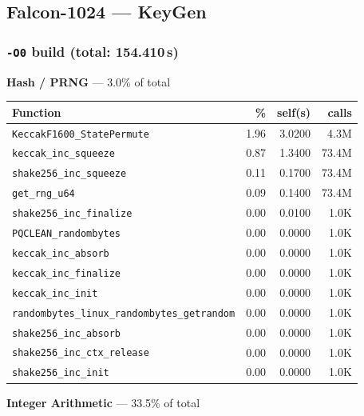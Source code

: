 \documentclass[11pt,a4paper]{article}
\begin{document}
\subsection{Falcon-1024 --- KeyGen}

\subsubsection*{\texttt{-O0} build (total: 154.410\,s)}

\noindent\colorbox{hashcolor}{\strut \textbf{Hash / PRNG} --- 3.0\% of total}
\vspace{2pt}

\begin{longtable}{p{7.5cm}rrr}
\toprule
Function & \% & self(s) & calls \\
\midrule
\endhead
  \texttt{KeccakF1600\_StatePermute} & 1.96 & 3.0200 & 4.3M \\
  \texttt{keccak\_inc\_squeeze} & 0.87 & 1.3400 & 73.4M \\
  \texttt{shake256\_inc\_squeeze} & 0.11 & 0.1700 & 73.4M \\
  \texttt{get\_rng\_u64} & 0.09 & 0.1400 & 73.4M \\
  \texttt{shake256\_inc\_finalize} & 0.00 & 0.0100 & 1.0K \\
  \texttt{PQCLEAN\_randombytes} & 0.00 & 0.0000 & 1.0K \\
  \texttt{keccak\_inc\_absorb} & 0.00 & 0.0000 & 1.0K \\
  \texttt{keccak\_inc\_finalize} & 0.00 & 0.0000 & 1.0K \\
  \texttt{keccak\_inc\_init} & 0.00 & 0.0000 & 1.0K \\
  \texttt{randombytes\_linux\_randombytes\_getrandom} & 0.00 & 0.0000 & 1.0K \\
  \texttt{shake256\_inc\_absorb} & 0.00 & 0.0000 & 1.0K \\
  \texttt{shake256\_inc\_ctx\_release} & 0.00 & 0.0000 & 1.0K \\
  \texttt{shake256\_inc\_init} & 0.00 & 0.0000 & 1.0K \\
\bottomrule
\end{longtable}

\noindent\colorbox{intcolor}{\strut \textbf{Integer Arithmetic} --- 33.5\% of total}
\vspace{2pt}
\end{document}
